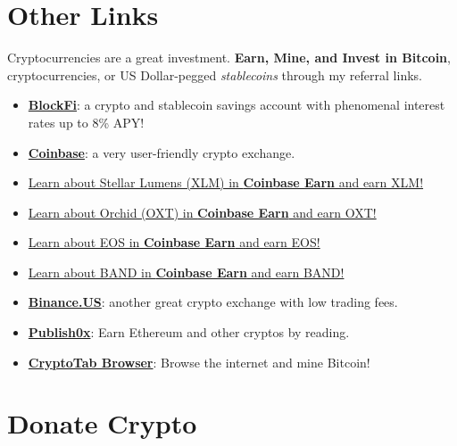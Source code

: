 \section*{Other Links}
\noindent Cryptocurrencies are a great investment. {\bf Earn, Mine, and Invest in Bitcoin}, cryptocurrencies, or US Dollar-pegged {\em stablecoins} through my referral links.
\begin{itemize}
   \item \href{https://blockfi.mxuy67.net/c/2612759/889697/10568}{{\bf BlockFi}}: a crypto and stablecoin savings account with phenomenal interest rates up to 8\% APY!
   \item \href{https://www.coinbase.com/join/landqu_e}{{\bf Coinbase}}: a very user-friendly crypto exchange.
   \item \href{https://coinbase.com/earn/xlm/invite/cq8rgxt4}{Learn about Stellar Lumens (XLM) in {\bf Coinbase Earn} and earn XLM!}
   \item \href{https://coinbase.com/earn/oxt/invite/39h7v158}{Learn about Orchid (OXT) in {\bf Coinbase Earn} and earn OXT!}
   \item \href{https://coinbase.com/earn/eos/invite/8b95vgnx}{Learn about EOS in {\bf Coinbase Earn} and earn EOS!}
   \item \href{https://coinbase.com/earn/band/invite/2s49zc65}{Learn about BAND in {\bf Coinbase Earn} and earn BAND!}
   \item \href{https://www.binance.us/?ref=35061022}{{\bf Binance.US}}: another great crypto exchange with low trading fees.
   \item \href{https://www.publish0x.com?a=Jxbo2qkAag}{{\bf Publish0x}}: Earn Ethereum and other cryptos by reading.
   \item \href{https://cryptotabbrowser.com/16356908}{{\bf CryptoTab Browser}}: Browse the internet and mine Bitcoin!
\end{itemize}

\section*{Donate Crypto}

